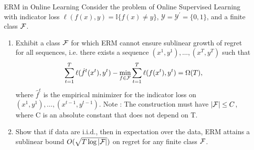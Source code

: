 \begin{exercise}[]{ERM in Online Learning}
Consider the problem of Online Supervised Learning with indicator loss $ \ell(f(x),y) = \mathbb{I}\{f(x)\neq y\} $, $
\mathcal{Y} = \mathcal{Y}^{\prime} = \{ 0,1 \} $, and a finite class $ \mathcal{F} $.
\begin{enumerate}

	\item Exhibit a class $ \mathcal{F} $ for which ERM cannot ensure sublinear growth of regret for all sequences, i.e.
		there exists a sequence $ (x^{1},y^{1}), \ldots, (x^{T},y^T) $ such that 
\begin{equation*}
	\sum_{t=1}^{T}\ell(\hat{f}^t(x^t),y^t) - \min_{f\in\mathcal{F}}\sum_{t=1}^T\ell(f(x^{t}),y^{t}) = \Omega(T),
\end{equation*}
where $ \hat{f}^t $ is the empirical minimizer for the indicator loss on $ (x^1,y^1),\ldots,(x^{t-1},y^{t-1}). $ Note :
The construction must have $ |\mathcal{F}| \leq C $, where C is an absolute constant that does not depend on T.

	\item Show that if data are i.i.d., then in expectation over the data, ERM attains a sublinear bound $
		O(\sqrt{T\log |\mathcal{F}|}) $ on regret for any finite class $ \mathcal{F} $.
\end{enumerate}
\end{exercise}


